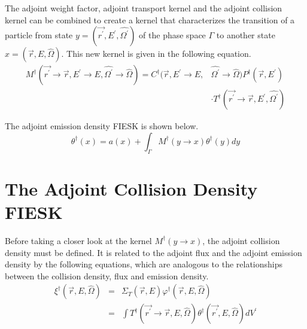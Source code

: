 The adjoint weight factor, adjoint transport kernel and the adjoint collision
kernel can be combined to create a kernel that characterizes the transition of
a particle from state $y = (\vec{r^{'}},E^{'},\hat{\Omega^{'}})$ of the phase
space $\Gamma$ to another state $x = (\vec{r},E,\hat{\Omega})$. This new kernel
is given in the following equation.
\begin{equation}
  \begin{split}
    M^{\dagger}(\vec{r^{'}} \to \vec{r},E^{'} \to E,\hat{\Omega^{'}} \to \hat{\Omega})
    = C^{\dagger}(\vec{r},E^{'} \to E,&\hat{\Omega^{'}} \to \hat{\Omega})
    P^{\dagger}(\vec{r},E^{'}) \\
    & \cdot T^{\dagger}(\vec{r^{'}} \to \vec{r},E^{'},\hat{\Omega^{'}})
  \end{split}
\end{equation}

The adjoint emission density FIESK is shown below.
\begin{equation}
  \theta^{\dagger}(x) = a(x) + \int_{\Gamma}M^{\dagger}(y \to x) \theta^{\dagger}(y) dy
\end{equation}

\section{The Adjoint Collision Density FIESK}
Before taking a closer look at the kernel $M^{\dagger}(y \to x)$, the adjoint
collision density must be defined. It is related to the adjoint flux and the
adjoint emission density by the following equations, which are analogous to
the relationships between the collision density, flux and emission density.
\begin{eqnarray}
  \xi^{\dagger}(\vec{r},E,\hat{\Omega}) & = & \Sigma_T(\vec{r},E)
  \varphi^{\dagger}(\vec{r},E,\hat{\Omega}) \\
  & = & \int T^{\dagger}(\vec{r^{'}} \to \vec{r},E,\hat{\Omega})
  \theta^{\dagger}(\vec{r^{'}},E,\hat{\Omega}) dV^{'}
  \label{eq:adj_collision_dens_to_adj_emission_dens}
\end{eqnarray}

